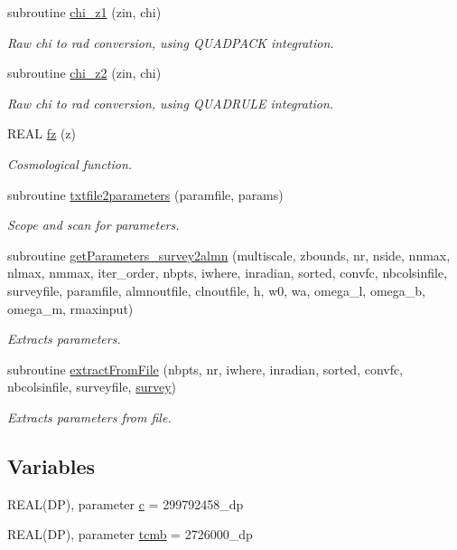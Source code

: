 \begin{DoxyCompactItemize}
subroutine \hyperlink{namespacef3dex__cosmotools_aae4fa92003adf2bfde48fa0dfcbf6b51}{chi\_\-z1} (zin, chi)
\begin{DoxyCompactList}\small\item\em Raw chi to rad conversion, using QUADPACK integration. \end{DoxyCompactList}\item 
subroutine \hyperlink{namespacef3dex__cosmotools_a6c29a874ae95da9fb207a2f63729eecf}{chi\_\-z2} (zin, chi)
\begin{DoxyCompactList}\small\item\em Raw chi to rad conversion, using QUADRULE integration. \end{DoxyCompactList}\item 
REAL \hyperlink{namespacef3dex__cosmotools_abba0e9b02d0f46a5abce5a0830da7f4d}{fz} (z)
\begin{DoxyCompactList}\small\item\em Cosmological function. \end{DoxyCompactList}\item 
subroutine \hyperlink{namespacef3dex__cosmotools_a609d3f29da9fc1be3bf27757e25532eb}{txtfile2parameters} (paramfile, params)
\begin{DoxyCompactList}\small\item\em Scope and scan for parameters. \end{DoxyCompactList}\item 
subroutine \hyperlink{namespacef3dex__cosmotools_a8405dbd12e86a408520f40f1b0a68919}{getParameters\_\-survey2almn} (multiscale, zbounds, nr, nside, nnmax, nlmax, nmmax, iter\_\-order, nbpts, iwhere, inradian, sorted, convfc, nbcolsinfile, surveyfile, paramfile, almnoutfile, clnoutfile, h, w0, wa, omega\_\-l, omega\_\-b, omega\_\-m, rmaxinput)
\begin{DoxyCompactList}\small\item\em Extracts parameters. \end{DoxyCompactList}\item 
subroutine \hyperlink{namespacef3dex__cosmotools_aaef3c07f112a83e6ff7a2762d5202fae}{extractFromFile} (nbpts, nr, iwhere, inradian, sorted, convfc, nbcolsinfile, surveyfile, \hyperlink{modulesurvey}{survey})
\begin{DoxyCompactList}\small\item\em Extracts parameters from file. \end{DoxyCompactList}\end{DoxyCompactItemize}
\subsection*{Variables}
\begin{DoxyCompactItemize}
\item 
REAL(DP), parameter \hyperlink{namespacef3dex__cosmotools_a211d492263b2040371280021352d9154}{c} = 299792458\_\-dp
\item 
REAL(DP), parameter \hyperlink{namespacef3dex__cosmotools_a8953fe6dc399fcf889789bee9702ee65}{tcmb} = 2726000\_\-dp
\end{DoxyCompactItemize}


